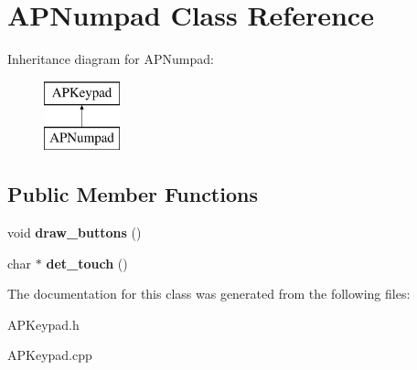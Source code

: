 \hypertarget{class_a_p_numpad}{\section{A\-P\-Numpad Class Reference}
\label{class_a_p_numpad}
}
Inheritance diagram for A\-P\-Numpad\-:\begin{figure}[H]
\begin{center}
\leavevmode
\includegraphics[height=2.000000cm]{class_a_p_numpad}
\end{center}
\end{figure}
\subsection*{Public Member Functions}
\begin{DoxyCompactItemize}
\item 
\hypertarget{class_a_p_numpad_aa499d162fb1623e00855cfade46c0b53}{void {\bfseries draw\-\_\-buttons} ()}\label{class_a_p_numpad_aa499d162fb1623e00855cfade46c0b53}

\item 
\hypertarget{class_a_p_numpad_a8c055fa67f6b7cba9f18aed4ca766b46}{char $\ast$ {\bfseries det\-\_\-touch} ()}\label{class_a_p_numpad_a8c055fa67f6b7cba9f18aed4ca766b46}

\end{DoxyCompactItemize}


The documentation for this class was generated from the following files\-:\begin{DoxyCompactItemize}
\item 
A\-P\-Keypad.\-h\item 
A\-P\-Keypad.\-cpp\end{DoxyCompactItemize}
